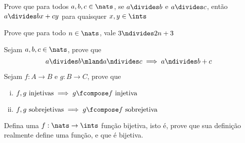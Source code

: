 \begin{exercise}
%
Prove que para todos $a, b, c \in \nats$, se $a \divides b$ e $a \divides c$, então $a \divides bx + cy$ para quaisquer $x, y \in \ints$
\end{exercise}

\begin{exercise}
%
Prove que para todo $n \in\nats$, vale $3 \ndivides 2n + 3$
\end{exercise}

\begin{exercise}
%
Sejam $a, b, c \in\nats$, prove que
	$$ a \divides b \mland a \ndivides c \implies a \ndivides b + c $$
\end{exercise}

\begin{exercise}
%
Sejam $f : A \to B$ e $g : B \to C$, prove que
	\begin{enumerate}[(i)]
		\item $ f, g \text{ injetivas} \implies g \fcompose f \text{ injetiva}$

		\item $f, g \text{ sobrejetivas} \implies g \fcompose f \text{ sobrejetiva}$
	\end{enumerate}
\end{exercise}

\begin{exercise}
%
Defina uma $f : \nats\to\ints$ função bijetiva, isto é, prove que sua definição realmente define uma função, e que é bijetiva.
\end{exercise}

